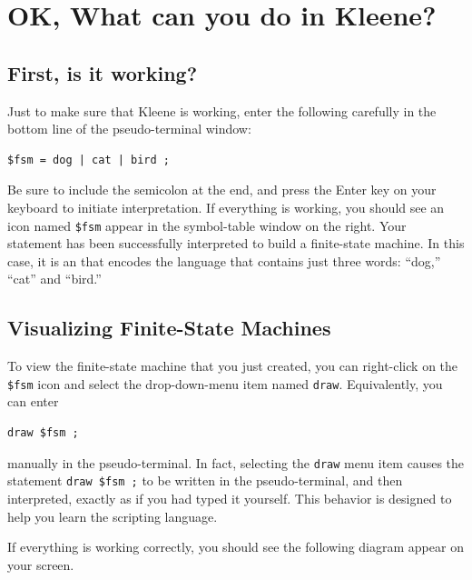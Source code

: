 \section{OK, What can you do in Kleene?}

\subsection{First, is it working?}

Just to make sure that Kleene is working, enter the following carefully in the bottom line of the
pseudo-terminal window:

\begin{Verbatim}
$fsm = dog | cat | bird ;
\end{Verbatim}

\noindent
Be sure to include the semicolon at the end, and press the Enter key on your keyboard to
initiate interpretation.  If everything is working, you should see an icon named
\verb!$fsm!
appear in the symbol-table window on the right.  Your statement has 
been successfully interpreted to
build a finite-state machine.  In this case, it is an \fsm{} that encodes the
language that contains just three words:  ``dog,'' ``cat'' and ``bird.''

\subsection{Visualizing Finite-State Machines}

To view the finite-state machine that you just created, you can right-click on the \verb!$fsm! icon and
select the drop-down-menu item
named \texttt{draw}.  Equivalently, you can enter 


\begin{Verbatim}
draw $fsm ;
\end{Verbatim}

\noindent
manually in the pseudo-terminal.  In fact, selecting the \texttt{draw} menu
item causes the statement \verb!draw $fsm ;! to be written in the
pseudo-terminal, and then interpreted, exactly as if you had typed it yourself.  This
behavior is designed to help you learn the scripting language.

If everything is working correctly, you should see the following \fsm{}
diagram appear on your screen.



